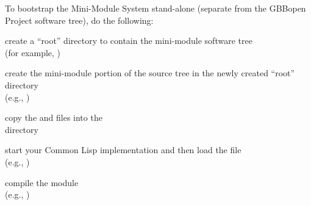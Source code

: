 \documentclass[10pt,twoside,english,pdftex]{article}
\begin{document}
To bootstrap the Mini-Module System stand-alone (separate from the GBBopen
Project software tree), do the following:
\begin{tightitemize}
\item create a ``root'' directory to contain the mini-module software tree\\
  (for example, )
\item create the mini-module portion of the source tree in the newly created
  ``root'' directory\\
  (e.g., )
\item copy the  and 
  files into the\\
   directory
\item start your Common Lisp implementation and then load the
   file\\
   (e.g., )
\item compile the  module\\
   (e.g., )
\end{tightitemize}

\W\entities
\T\clearpage
\T\renewcommand{\headrulewidth}{0.01pt}

\end{document}
